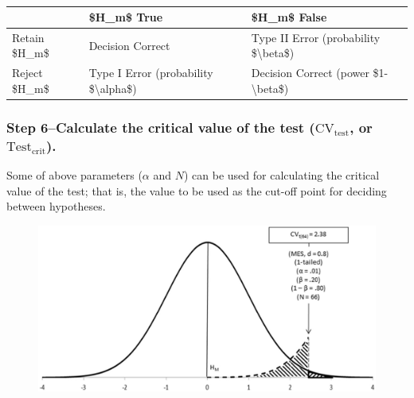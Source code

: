 \documentclass[
]{book}
\theoremstyle{definition}
\theoremstyle{definition}
\theoremstyle{definition}
\theoremstyle{definition}
\theoremstyle{remark}
\begin{document}
\begin{table}

\caption{\label{tab:unnamed-chunk-252}}
\centering
\begin{tabular}[t]{lll}
\toprule
  & \$H\_m\$ True & \$H\_m\$ False\\
\midrule
Retain \$H\_m\$ & Decision Correct & Type II Error (probability \$\textbackslash{}beta\$)\\
Reject \$H\_m\$ & Type I Error (probability \$\textbackslash{}alpha\$) & Decision Correct (power \$1-\textbackslash{}beta\$)\\
\bottomrule
\end{tabular}
\end{table}

\hypertarget{step-6calculate-the-critical-value-of-the-test-mboxcv_mboxtest-or-mboxtest_mboxcrit.}{%
\subsubsection*{\texorpdfstring{Step 6--Calculate the critical value of the test (\(\mbox{CV}_{\mbox{test}}\), or \(\mbox{Test}_{\mbox{crit}}\)).}{Step 6--Calculate the critical value of the test (\textbackslash mbox\{CV\}\_\{\textbackslash mbox\{test\}\}, or \textbackslash mbox\{Test\}\_\{\textbackslash mbox\{crit\}\}).}}\label{step-6calculate-the-critical-value-of-the-test-mboxcv_mboxtest-or-mboxtest_mboxcrit.}}

Some of above parameters (\(\alpha\) and \(N\)) can be used for calculating the critical value of the test; that is, the value to be used as the cut-off point for deciding between hypotheses.

\begin{figure}

{\centering \includegraphics[width=0.6\linewidth]{images/Perezgonzalez2015Fig5} 

}

\end{figure}
\end{document}
